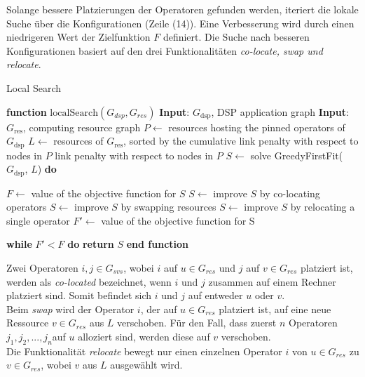 \documentclass{article}
\begin{document}
Solange bessere Platzierungen der Operatoren gefunden werden, iteriert die lokale Suche über die Konfigurationen  (Zeile (14)). 
Eine Verbesserung wird durch einen niedrigeren Wert der Zielfunktion $F$ definiert. 
Die Suche nach besseren Konfigurationen basiert auf den drei Funktionalitäten \textit{co-locate, swap und relocate}. \\


\begin{algorithm}[H]
    \caption{Local Search}
    \begin{algorithmic}[1]
        \STATE \textbf{function} $\mathrm{localSearch}(G_{dsp}, G_{res})$
        \STATE \textbf{Input}: $G_{\text{dsp}}$, DSP application graph
        \STATE \textbf{Input}: $G_{\text{res}}$, computing resource graph
        \STATE $P \leftarrow$ resources hosting the pinned operators of $G_{\text{dsp}}$
        \STATE $L \leftarrow$ resources of $G_{\text{res}}$, 
        sorted by the cumulative link penalty with respect to nodes in $P$
        \STATE link penalty with respect to nodes in $P$
        \STATE $S \leftarrow$  solve GreedyFirstFit($G_{\text{dsp}}$, $L$)
        \STATE \textbf{do}

        \STATE \hspace{\algorithmicindent} $F \leftarrow$  value of the objective function for $S$
        \STATE \hspace{\algorithmicindent} $S \leftarrow$  improve $S$ by co-locating operators
        \STATE \hspace{\algorithmicindent} $S \leftarrow$  improve $S$ by swapping resources
        \STATE \hspace{\algorithmicindent} $S \leftarrow$  improve $S$ by relocating a single operator
        \STATE \hspace{\algorithmicindent} $F' \leftarrow$ value of the objective function for S

        \STATE \textbf{while} $F'  < F$ \textbf{do}
        \STATE \hspace{\algorithmicindent} \textbf{return} $S$
        \STATE \textbf{end function}
    \end{algorithmic}
    \label{local-search-algo}
\end{algorithm}


Zwei Operatoren $i,j \in G_{svs}$, wobei $i$ auf $u \in G_{res}$ und $j$ auf $v \in G_{res}$ platziert ist, werden als \textit{co-located} bezeichnet, 
wenn $i$ und $j$ zusammen auf einem Rechner platziert sind. Somit befindet sich $i$ und $j$ auf entweder $u$ oder $v$.\\
Beim \textit{swap} wird der Operator $i$, der auf $u \in G_{res}$ platziert ist, auf eine neue Ressource $v \in G_{res}$ aus $L$ verschoben. 
Für den Fall, dass zuerst $n$ Operatoren $j_1, j_2, ..., j_n$auf $u$ alloziert sind, werden diese auf $v$ verschoben. \\ 
Die Funktionalität \textit{relocate}  bewegt nur einen einzelnen Operator $i$ von $u \in G_{res}$ zu $v \in G_{res}$, 
wobei $v$ aus $L$ ausgewählt wird. 
\end{document}

